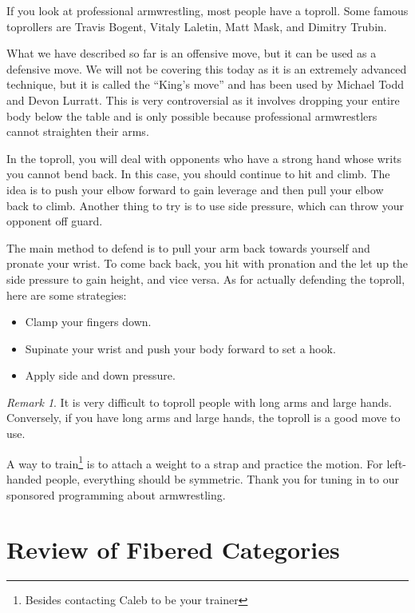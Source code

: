 \documentclass[leqno, openany]{memoir}
\theoremstyle{definition}
\theoremstyle{remark}
\newtheorem{rmk}[thm]{Remark}
\theoremstyle{plain}
\theoremstyle{definition}
\theoremstyle{remark}
\begin{document}
If you look at professional armwrestling, most people have a toproll. Some
famous toprollers are Travis Bogent, Vitaly Laletin, Matt Mask, and Dimitry
Trubin.

What we have described so far is an offensive move, but it can be used as a
defensive move. We will not be covering this today as it is an extremely
advanced technique, but it is called the ``King's move'' and has been used by
Michael Todd and Devon Lurratt. This is very controversial as it involves
dropping your entire body below the table and is only possible because
professional armwrestlers cannot straighten their arms.

In the toproll, you will deal with opponents who have a strong hand whose writs
you cannot bend back. In this case, you should continue to hit and climb. The
idea is to push your elbow forward to gain leverage and then pull your elbow
back to climb. Another thing to try is to use side pressure, which can throw
your opponent off guard.

The main method to defend is to pull your arm back towards yourself and pronate
your wrist. To come back back, you hit with pronation and the let up the side
pressure to gain height, and vice versa. As for actually defending the toproll,
here are some strategies: \begin{itemize} \item Clamp your fingers down.  \item
Supinate your wrist and push your body forward to set a hook.  \item Apply side
and down pressure.  \end{itemize}

\begin{rmk} It is very difficult to toproll people with long arms and large
hands. Conversely, if you have long arms and large hands, the toproll is a good
move to use.  \end{rmk}

A way to train\footnote{Besides contacting Caleb to be your trainer} is to
attach a weight to a strap and practice the motion. For left-handed people,
everything should be symmetric. Thank you for tuning in to our sponsored
programming about armwrestling.

\section{Review of Fibered Categories}%
\end{document}
